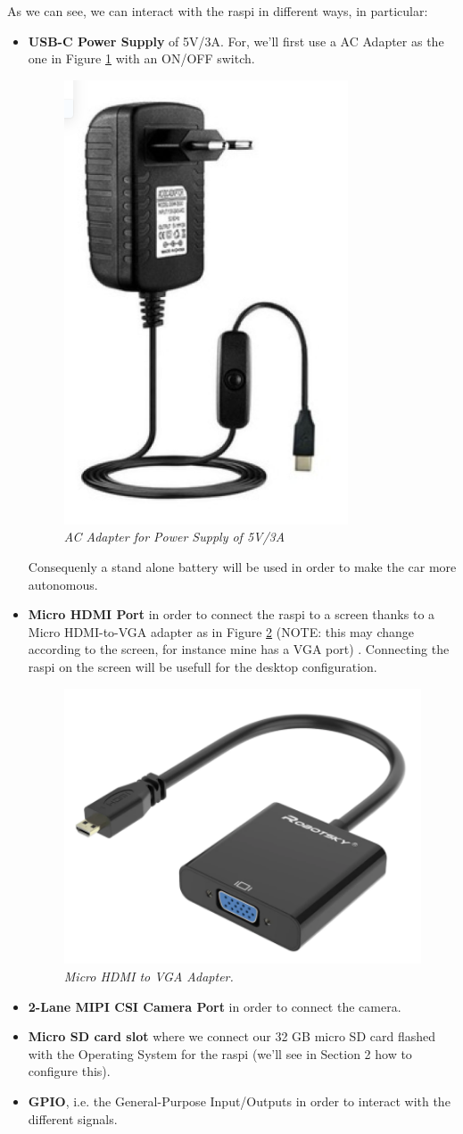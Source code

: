\documentclass[12pt,a4paper]{article}
\begin{document}
    As we can see, we can interact with the raspi in different ways, in particular:
    \begin{itemize}
    	\item \textbf{USB-C Power Supply} of 5V/3A. For, we'll first use a AC Adapter as the one in Figure \ref{fig:Adapter} with an ON/OFF switch. 
    	
    	   \begin{figure}[h]
    	   	\centering
    	   	\includegraphics[width=0.2\linewidth]{Imm/Adapter}
    	   	\caption{\textit{AC Adapter for Power Supply of 5V/3A}}
    	   	\label{fig:Adapter}
    	   \end{figure}
    	   
    	Consequenly a stand alone battery will be used in order to make the car more autonomous.
    	\item \textbf{Micro HDMI Port} in order to connect the raspi to a screen thanks to a Micro HDMI-to-VGA adapter as in Figure \ref{fig: VGA-Adapter} (NOTE: this may change according to the screen, for instance mine has a VGA port) . Connecting the raspi on the screen will be usefull for the desktop configuration.
    	 \begin{figure}[h]
    	 	\centering
    	 	\includegraphics[width=0.2\linewidth]{Imm/VGA-Adapter}
    	 	\caption{\textit{Micro HDMI to VGA Adapter.}}
    	 	\label{fig: VGA-Adapter}
    	 \end{figure}
    	
    	\item \textbf{2-Lane MIPI CSI Camera Port} in order to connect the camera.
    	\item \textbf{Micro SD card slot} where we connect our 32 GB micro SD card flashed with the Operating System for the raspi (we'll see in Section 2 how to configure this).
    	\item \textbf{GPIO}, i.e. the General-Purpose Input/Outputs in order to interact with the different signals.
    \end{itemize}
    
\end{document}
